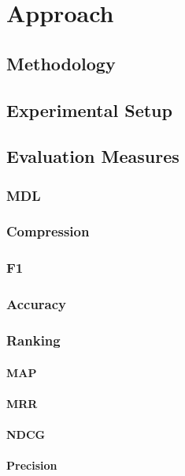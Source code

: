 \chapter{Approach}
\label{chap:approach}

\section{Methodology}

\section{Experimental Setup}

\section{Evaluation Measures}
\subsection{MDL}
\subsection{Compression}
\subsection{F1}
\subsection{Accuracy}
\subsection{Ranking}
\subsubsection{MAP}
\subsubsection{MRR}
\subsubsection{NDCG}
\subsubsection{Precision}

